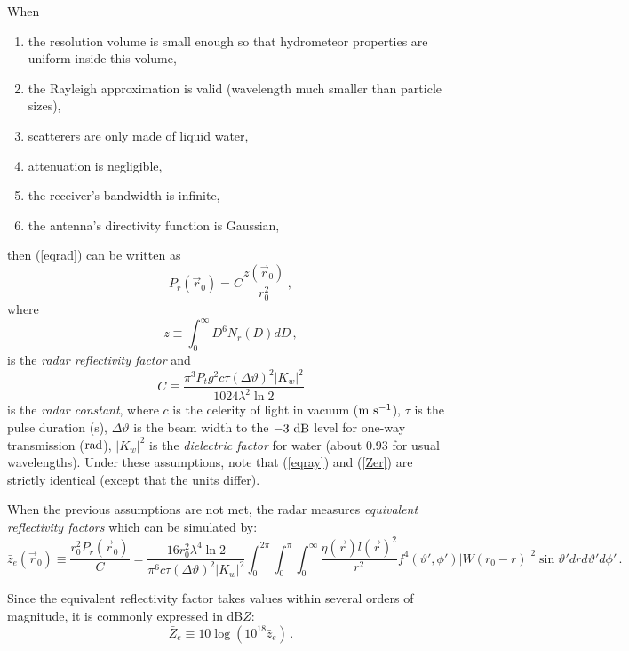 When 
\begin{enumerate}
\item the resolution volume is small enough so that hydrometeor properties are uniform inside this volume,
\item the Rayleigh approximation is valid (wavelength much smaller than particle sizes),
\item scatterers are only made of liquid water,
\item attenuation is negligible,
\item the receiver's bandwidth is infinite,
\item the antenna's directivity function is  Gaussian,
\end{enumerate}
then (\ref{eqrad}) can be written as
\begin{equation}
P_r(\vec r_0)=C\frac{z(\vec r_0)}{r_0^2}\,,\label{eqradzC}
\end{equation}
where
\begin{equation}
z\equiv\int_0^\infty D^6N_r(D)d D\,,\label{eqray}
\end{equation}
is the \emph{radar reflectivity factor} and
\begin{equation}
C\equiv\frac{\pi^3 P_tg^2c\tau(\Delta\vartheta)^2|K_w|^2}{1024\lambda^2\ln2}
\end{equation}
is the \emph{radar constant}, where $c$ is the celerity of light in vacuum ($\rm m~s^{-1}$), $\tau$ is the pulse duration (s), $\Delta\vartheta$ is the beam width to the $-3\rm~dB$ level for one-way transmission ($\rm rad$), $|K_w|^2$ is the \emph{dielectric factor} for water (about $0.93$ for usual wavelengths). Under these assumptions, note that (\ref{eqray}) and (\ref{Zer}) are strictly identical (except that the units differ).

When the previous assumptions are not met, the radar measures \emph{equivalent reflectivity factors} which can be simulated by:
\begin{equation}
\bar z_e(\vec r_0)\equiv\frac{r_0^2P_r(\vec r_0)}C=\frac{16r_0^2\lambda^4\ln2}{\pi^6c\tau(\Delta\vartheta)^2|K_w|^2}\int_0^{2\pi}\!\!\!\int_0^\pi\!\!\!\int_0^\infty\frac{\eta(\vec r)l(\vec r)^2}{r^2}f^4(\vartheta',\phi')|W(r_0-r)|^2\sin\vartheta'd rd\vartheta'd\phi'\,.
\end{equation}


Since the equivalent reflectivity factor takes values within several orders of magnitude, it is commonly expressed in dB$Z$:
\begin{equation}
\bar Z_e\equiv10\log\left(10^{18}\bar z_e\right)\,.
\end{equation}

